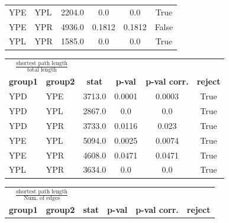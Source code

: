 {\begin{table}
\begin{tabular}{x{2cm}x{2cm}S[round-mode = places,round-precision = 0,table-format=4.0]S[table-format=2.4]S[table-format=2.4]c}
      YPE       &       YPL       &     2204.0    &      0.0      &        0.0         &       True       \\
      YPE       &       YPR       &     4936.0    &     0.1812    &       0.1812       &      False       \\
      YPL       &       YPR       &     1585.0    &      0.0      &        0.0         &       True       \\
\bottomrule
\end{tabular}
\end{table}
%
\begin{table}
\centering
\footnotesize
\begin{tabular}{x{2cm}x{2cm}S[round-mode = places,round-precision = 0,table-format=4.0]S[table-format=2.4]S[table-format=2.4]c}
\toprule
{}&&&\\
\textbf{group1} & \textbf{group2} & \textbf{stat} &\textbf{p-val}&\textbf{p-val corr.}& \textbf{reject}  \\
\midrule
      YPD       &       YPE       &     3713.0    &     0.0001    &       0.0003       &       True       \\
      YPD       &       YPL       &     2867.0    &      0.0      &        0.0         &       True       \\
      YPD       &       YPR       &     3733.0    &     0.0116    &       0.023        &       True       \\
      YPE       &       YPL       &     5094.0    &     0.0025    &       0.0074       &       True       \\
      YPE       &       YPR       &     4608.0    &     0.0471    &       0.0471       &       True       \\
      YPL       &       YPR       &     3634.0    &      0.0      &        0.0         &       True       \\
\bottomrule
\end{tabular}
\end{table}
%
\begin{table}
\centering
\footnotesize
\begin{tabular}{x{2cm}x{2cm}S[round-mode = places,round-precision = 0,table-format=4.0]S[table-format=2.4]S[table-format=2.4]c}
\toprule
{}&&&\\
\textbf{group1} & \textbf{group2} & \textbf{stat} &\textbf{p-val}&\textbf{p-val corr.}& \textbf{reject}  \\

\end{tabular}
\end{table}}
